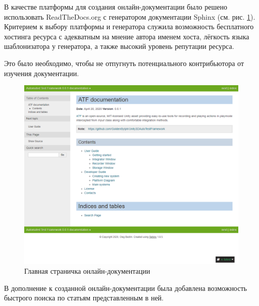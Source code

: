 В качестве платформы для создания онлайн-документации было решено использовать ReadTheDocs.org с генератором документации Sphinx (см. рис. \ref{online_docs}). Критерием к выбору платформы и генератора служила возможность бесплатного хостинга ресурса с адекватным на мнение автора именем хоста, лёгкость языка шаблонизатора у генератора, а также высокий уровень репутации ресурса.

Это было необходимо, чтобы не отпугнуть потенциального контрибьютора от изучения документации.

\begin{figure}[H]
	\centering
	\includegraphics[width=\linewidth]{online_docs.png}
	\caption{Главная страничка онлайн-документации}
	\label{online_docs}
\end{figure}

В дополнение к созданной онлайн-документации была добавлена возможность быстрого поиска по статьям представленным в ней.

